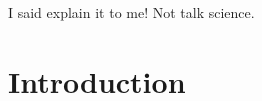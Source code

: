 



\begin{savequote}[50mm]
I said explain it to me! Not talk science.
\end{savequote}

\chapter{Introduction}
\label{cha:introduction}
\newcommand{\pathchapone}{1_introduction}

\ifpdf
    \graphicspath{{\pathchapone/figures/PNG/}{\pathchapone/figures/PDF/}{\pathchapone/figures/}}
\else
    \graphicspath{{\pathchapone/figures/EPS/}{\pathchapone/figures/}}
\fi






